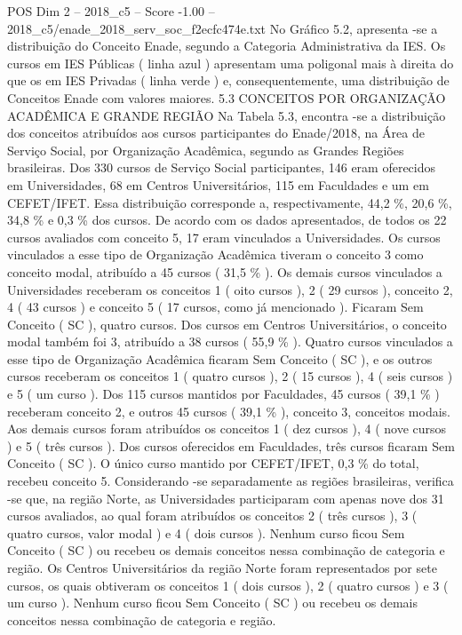 \begin{textsample}{POS Dim 2 – 2018\_c5 – Score -1.00 – 2018\_c5/enade\_2018\_serv\_soc\_f2ecfc474e.txt}
No Gráfico 5.2, apresenta -se a distribuição do Conceito Enade, segundo a Categoria Administrativa da IES.
Os cursos em IES Públicas ( linha azul ) apresentam uma poligonal mais à direita do que os em IES Privadas ( linha verde ) e, consequentemente, uma distribuição de Conceitos Enade com valores maiores. 5.3 CONCEITOS POR ORGANIZAÇÃO ACADÊMICA E GRANDE REGIÃO Na Tabela 5.3, encontra -se a distribuição dos conceitos atribuídos aos cursos participantes do Enade/2018, na Área de Serviço Social, por Organização Acadêmica, segundo as Grandes Regiões brasileiras.
Dos 330 cursos de Serviço Social participantes, 146 eram oferecidos em Universidades, 68 em Centros Universitários, 115 em Faculdades e um em CEFET/IFET.
Essa distribuição corresponde a, respectivamente, 44,2 \%, 20,6 \%, 34,8 \% e 0,3 \% dos cursos.
De acordo com os dados apresentados, de todos os 22 cursos avaliados com conceito 5, 17 eram vinculados a Universidades.
Os cursos vinculados a esse tipo de Organização Acadêmica tiveram o conceito 3 como conceito modal, atribuído a 45 cursos ( 31,5 \% ).
Os demais cursos vinculados a Universidades receberam os conceitos 1 ( oito cursos ), 2 ( 29 cursos ), conceito 2, 4 ( 43 cursos ) e conceito 5 ( 17 cursos, como já mencionado ).
Ficaram Sem Conceito ( SC ), quatro cursos.
Dos cursos em Centros Universitários, o conceito modal também foi 3, atribuído a 38 cursos ( 55,9 \% ).
Quatro cursos vinculados a esse tipo de Organização Acadêmica ficaram Sem Conceito ( SC ), e os outros cursos receberam os conceitos 1 ( quatro cursos ), 2 ( 15 cursos ), 4 ( seis cursos ) e 5 ( um curso ).
Dos 115 cursos mantidos por Faculdades, 45 cursos ( 39,1 \% ) receberam conceito 2, e outros 45 cursos ( 39,1 \% ), conceito 3, conceitos modais.
Aos demais cursos foram atribuídos os conceitos 1 ( dez cursos ), 4 ( nove cursos ) e 5 ( três cursos ).
Dos cursos oferecidos em Faculdades, três cursos ficaram Sem Conceito ( SC ).
O único curso mantido por CEFET/IFET, 0,3 \% do total, recebeu conceito 5.
Considerando -se separadamente as regiões brasileiras, verifica -se que, na região Norte, as Universidades participaram com apenas nove dos 31 cursos avaliados, ao qual foram atribuídos os conceitos 2 ( três cursos ), 3 ( quatro cursos, valor modal ) e 4 ( dois cursos ).
Nenhum curso ficou Sem Conceito ( SC ) ou recebeu os demais conceitos nessa combinação de categoria e região.
Os Centros Universitários da região Norte foram representados por sete cursos, os quais obtiveram os conceitos 1 ( dois cursos ), 2 ( quatro cursos ) e 3 ( um curso ).
Nenhum curso ficou Sem Conceito ( SC ) ou recebeu os demais conceitos nessa combinação de categoria e região.

\end{textsample}
